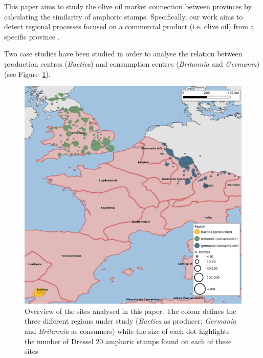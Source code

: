 This paper aims to study the olive oil market connection between provinces by calculating the similarity of amphoric stamps. Specifically, our work aims to detect regional processes focused on a commercial product (i.e. olive oil) from a specific province \citep{isaksen_network_2006}. 


Two case studies have been studied in order to analyse the relation between production centres (\textit{Baetica}) and consumption centres (\textit{Britannia} and \textit{Germania}) (see Figure~\ref{general}).

\begin{figure}[htp]
	\centering
\includegraphics[width=\linewidth]{general_map}
\caption{Overview of the sites analysed in this paper. The colour defines the three different regions under study (\textit{Baetica} as producer; \textit{Germania} and \textit{Britannia} as consumers) while the size of each dot highlights the number of Dressel 20 amphoric stamps found on each of these sites}

\label{general}
\end{figure} 
        
